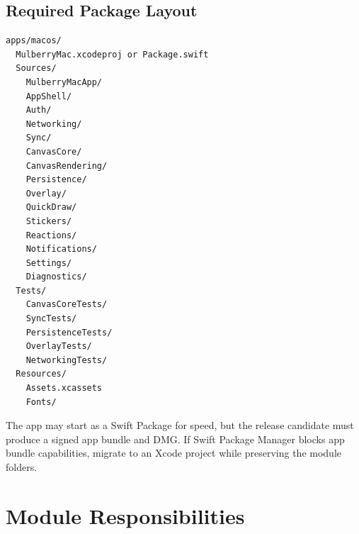 \documentclass[11pt]{article}
\begin{document}
\subsection{Required Package Layout}

\begin{verbatim}
apps/macos/
  MulberryMac.xcodeproj or Package.swift
  Sources/
    MulberryMacApp/
    AppShell/
    Auth/
    Networking/
    Sync/
    CanvasCore/
    CanvasRendering/
    Persistence/
    Overlay/
    QuickDraw/
    Stickers/
    Reactions/
    Notifications/
    Settings/
    Diagnostics/
  Tests/
    CanvasCoreTests/
    SyncTests/
    PersistenceTests/
    OverlayTests/
    NetworkingTests/
  Resources/
    Assets.xcassets
    Fonts/
\end{verbatim}

The app may start as a Swift Package for speed, but the release candidate must produce a signed app bundle and DMG. If Swift Package Manager blocks app bundle capabilities, migrate to an Xcode project while preserving the module folders.

\section{Module Responsibilities}
\end{document}
